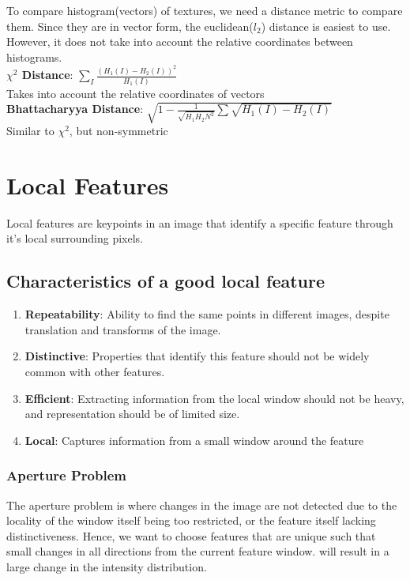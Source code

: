 \documentclass[12pt]{article}
\begin{document}
To compare histogram(vectors) of textures, we need a distance metric to compare them. Since they are in vector form, the euclidean($l_2$) distance is easiest to use. However, it does not take into account the relative coordinates between histograms.\\

\textbf{$\chi^2$ Distance}: $\sum_I \frac{(H_1(I) - H_2(I))^2}{H_1(I)}$ \\
Takes into account the relative coordinates of vectors\\ 

\textbf{Bhattacharyya Distance}: $\sqrt{1 - \frac{1}{\sqrt{H_1H_2N^2}} \sum\sqrt{H_1(I) - H_2(I)}}$ \\
Similar to $\chi^2$, but non-symmetric

\section{Local Features}

Local features are keypoints in an image that identify a specific feature through it's local surrounding pixels.

\subsection{Characteristics of a good local feature}
\begin{enumerate}
\item \textbf{Repeatability}: Ability to find the same points in different images, despite translation and transforms of the image.
\item \textbf{Distinctive}: Properties that identify this feature should not be widely common with other features.
\item \textbf{Efficient}: Extracting information from the local window should not be heavy, and representation should be of limited size.
\item \textbf{Local}: Captures information from a small window around the feature
\end{enumerate}

\subsubsection{Aperture Problem}

The aperture problem is where changes in the image are not detected due to the locality of the window itself being too restricted, or the feature itself lacking distinctiveness. Hence, we want to choose features that are unique such that small changes in all directions from the current feature window. will result in a large change in the intensity distribution.
\end{document}
